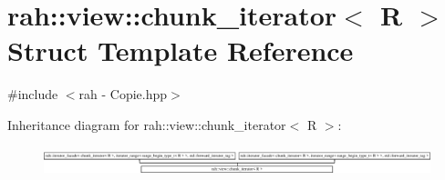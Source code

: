\hypertarget{structrah_1_1view_1_1chunk__iterator}{}\section{rah\+::view\+::chunk\+\_\+iterator$<$ R $>$ Struct Template Reference}
\label{structrah_1_1view_1_1chunk__iterator}


{\ttfamily \#include $<$rah -\/ Copie.\+hpp$>$}

Inheritance diagram for rah\+::view\+::chunk\+\_\+iterator$<$ R $>$\+:\begin{figure}[H]
\begin{center}
\leavevmode
\includegraphics[height=0.834575cm]{structrah_1_1view_1_1chunk__iterator}
\end{center}
\end{figure}
